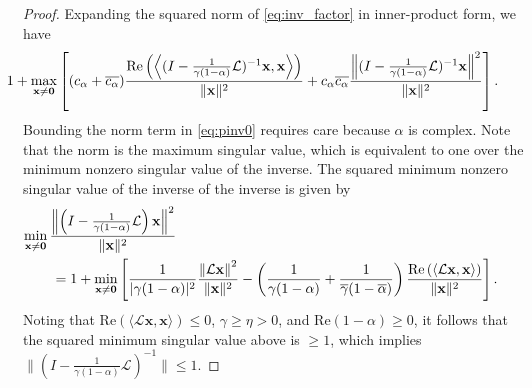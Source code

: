 \documentclass[review]{siamart}
\begin{document}
\begin{proof}
Expanding the squared norm of \eqref{eq:inv_factor} in inner-product form, we have
%
\begin{align}\label{eq:pinv0}
& \hspace{-5ex}
1 + \max_{\mathbf{x}\neq\mathbf{0}} \left[ (c_\alpha+\overline{c_\alpha})
	\frac{\textnormal{Re}\left(\left\langle (I - \tfrac{1}{\gamma(1-\alpha)}\mathcal{L})^{-1}\mathbf{x},
		\mathbf{x}\right\rangle\right)}{\|\mathbf{x}\|^2} + 
	c_\alpha\overline{c_\alpha}
	\frac{\left\|(I - \tfrac{1}{\gamma(1-\alpha)}\mathcal{L})^{-1}\mathbf{x}\right\|^2}
		{\|\mathbf{x}\|^2} \right].
\end{align}
%
Bounding the norm term in \eqref{eq:pinv0} requires care because $\alpha$ is
complex. Note that the norm is the maximum singular value, which is equivalent to one
over the minimum nonzero singular value of the inverse. The squared minimum nonzero
singular value of the inverse of the inverse is given by
%
\begin{align*}
&\hspace{-5ex}
\min_{\mathbf{x}\neq\mathbf{0}} \frac{\left\|\left(I - \tfrac{1}{\gamma(1-\alpha)}
	\mathcal{L}\right)\mathbf{x}\right\|^2}{\|\mathbf{x}\|^2} \\
& = 1 + \min_{\mathbf{x}\neq\mathbf{0}} \left[ \frac{1}{|\gamma(1-\alpha)|^2}
	\frac{\left\|\mathcal{L}\mathbf{x}\right\|^2}{\|\mathbf{x}\|^2}
	- \left(\frac{1}{\gamma(1-\alpha)} + \frac{1}{\overline{\gamma}(1-\overline{\alpha})}\right)
	\frac{\textnormal{Re}\left(\left\langle\mathcal{L}\mathbf{x},\mathbf{x}\right\rangle\right)}
		{\|\mathbf{x}\|^2}\right].
\end{align*}
%
Noting that Re$\left(\langle\mathcal{L}\mathbf{x},\mathbf{x}\rangle\right) \leq 0$,
$\gamma \geq \eta > 0$, and Re$(1-\alpha) \geq 0$, it follows that the squared minimum
singular value above is $\geq 1$, which implies $\|(I - \tfrac{1}{\gamma(1-\alpha)}
\mathcal{L})^{-1}\| \leq 1$.



\end{proof}
\end{document}
